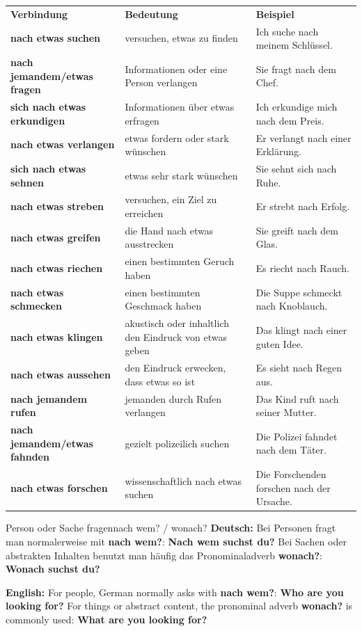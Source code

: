 \documentclass[a4paper,11pt]{article}
\newcommand{\GermanText}[1]{\textbf{Deutsch: }#1\par}
\newcommand{\EnglishText}[1]{{\small\color{SoftGray}\textbf{English: }#1\par}}
\begin{document}
        \begin{longtable}{>{\bfseries}p{4.1cm}|p{4.7cm}|p{5.4cm}}
            \rowcolor{HeaderBlueDark}
            \color{white}\textbf{Verbindung} &
            \color{white}\textbf{Bedeutung} &
            \color{white}\textbf{Beispiel} \\
            nach etwas suchen & versuchen, etwas zu finden & Ich suche nach meinem Schlüssel. \\
            nach jemandem/etwas fragen & Informationen oder eine Person verlangen & Sie fragt nach dem Chef. \\
            sich nach etwas erkundigen & Informationen über etwas erfragen & Ich erkundige mich nach dem Preis. \\
            nach etwas verlangen & etwas fordern oder stark wünschen & Er verlangt nach einer Erklärung. \\
            sich nach etwas sehnen & etwas sehr stark wünschen & Sie sehnt sich nach Ruhe. \\
            nach etwas streben & versuchen, ein Ziel zu erreichen & Er strebt nach Erfolg. \\
            nach etwas greifen & die Hand nach etwas ausstrecken & Sie greift nach dem Glas. \\
            nach etwas riechen & einen bestimmten Geruch haben & Es riecht nach Rauch. \\
            nach etwas schmecken & einen bestimmten Geschmack haben & Die Suppe schmeckt nach Knoblauch. \\
            nach etwas klingen & akustisch oder inhaltlich den Eindruck von etwas geben & Das klingt nach einer guten Idee. \\
            nach etwas aussehen & den Eindruck erwecken, dass etwas so ist & Es sieht nach Regen aus. \\
            nach jemandem rufen & jemanden durch Rufen verlangen & Das Kind ruft nach seiner Mutter. \\
            nach jemandem/etwas fahnden & gezielt polizeilich suchen & Die Polizei fahndet nach dem Täter. \\
            nach etwas forschen & wissenschaftlich nach etwas suchen & Die Forschenden forschen nach der Ursache. \\
        \end{longtable}

        \begin{grammarentry}{Person oder Sache fragen}{nach wem? / wonach?}
            \GermanText{Bei Personen fragt man normalerweise mit \textbf{nach wem?}: \textbf{Nach wem suchst du?} Bei Sachen oder abstrakten Inhalten benutzt man häufig das Pronominaladverb \textbf{wonach?}: \textbf{Wonach suchst du?}}
            \EnglishText{For people, German normally asks with \textbf{nach wem?}: \textbf{Who are you looking for?} For things or abstract content, the pronominal adverb \textbf{wonach?} is commonly used: \textbf{What are you looking for?}}
        \end{grammarentry}
\end{document}
